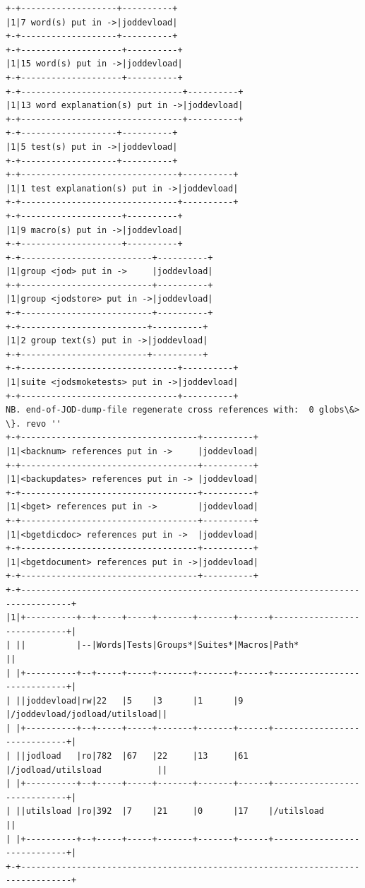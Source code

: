 \documentclass[11pt,letter,landscape]{article}
\begin{document}
    \begin{Verbatim}[commandchars=\\\{\}]
+-+-------------------+----------+
|1|7 word(s) put in ->|joddevload|
+-+-------------------+----------+
+-+--------------------+----------+
|1|15 word(s) put in ->|joddevload|
+-+--------------------+----------+
+-+--------------------------------+----------+
|1|13 word explanation(s) put in ->|joddevload|
+-+--------------------------------+----------+
+-+-------------------+----------+
|1|5 test(s) put in ->|joddevload|
+-+-------------------+----------+
+-+-------------------------------+----------+
|1|1 test explanation(s) put in ->|joddevload|
+-+-------------------------------+----------+
+-+--------------------+----------+
|1|9 macro(s) put in ->|joddevload|
+-+--------------------+----------+
+-+--------------------------+----------+
|1|group <jod> put in ->     |joddevload|
+-+--------------------------+----------+
|1|group <jodstore> put in ->|joddevload|
+-+--------------------------+----------+
+-+-------------------------+----------+
|1|2 group text(s) put in ->|joddevload|
+-+-------------------------+----------+
+-+-------------------------------+----------+
|1|suite <jodsmoketests> put in ->|joddevload|
+-+-------------------------------+----------+
NB. end-of-JOD-dump-file regenerate cross references with:  0 globs\&> \}. revo '' 
+-+-----------------------------------+----------+
|1|<backnum> references put in ->     |joddevload|
+-+-----------------------------------+----------+
|1|<backupdates> references put in -> |joddevload|
+-+-----------------------------------+----------+
|1|<bget> references put in ->        |joddevload|
+-+-----------------------------------+----------+
|1|<bgetdicdoc> references put in ->  |joddevload|
+-+-----------------------------------+----------+
|1|<bgetdocument> references put in ->|joddevload|
+-+-----------------------------------+----------+
+-+--------------------------------------------------------------------------------+
|1|+----------+--+-----+-----+-------+-------+------+-----------------------------+|
| ||          |--|Words|Tests|Groups*|Suites*|Macros|Path*                        ||
| |+----------+--+-----+-----+-------+-------+------+-----------------------------+|
| ||joddevload|rw|22   |5    |3      |1      |9     |/joddevload/jodload/utilsload||
| |+----------+--+-----+-----+-------+-------+------+-----------------------------+|
| ||jodload   |ro|782  |67   |22     |13     |61    |/jodload/utilsload           ||
| |+----------+--+-----+-----+-------+-------+------+-----------------------------+|
| ||utilsload |ro|392  |7    |21     |0      |17    |/utilsload                   ||
| |+----------+--+-----+-----+-------+-------+------+-----------------------------+|
+-+--------------------------------------------------------------------------------+

    \end{Verbatim}
\end{document}
